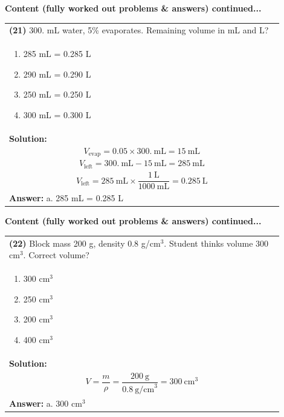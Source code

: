 \documentclass{article}
\begin{document}
{\newpage
\noindent
{\large\textbf{Content (fully worked out problems \& answers) continued...}}\\[0.2em]
\vspace{0.2cm}
\begin{tabular}{|p{0.9\linewidth}|}
\hline
\vspace{0.2cm}
\textbf{(21)} 300. mL water, 5\% evaporates. Remaining volume in mL and L? \\
\begin{minipage}[t]{0.85\linewidth}
\begin{enumerate}[label=\alph*.]
   \item 285 mL = 0.285 L
   \item 290 mL = 0.290 L
   \item 250 mL = 0.250 L
   \item 300 mL = 0.300 L
\end{enumerate}
\end{minipage}\\
\hline
\vspace{0.2cm}
\textbf{Solution:} \\
\[
V_\text{evap} = 0.05 \times 300.~\text{mL} = 15~\text{mL}
\] \\
\[
V_\text{left} = 300.~\text{mL} - 15~\text{mL} = 285~\text{mL}
\] \\
\[
V_\text{left} = 285~\text{mL} \times \frac{1~\text{L}}{1000~\text{mL}} = 0.285~\text{L}
\] \\ 
\hline
\vspace{0.2cm}
\textbf{Answer:} a. 285 mL = 0.285 L \\
\hline
\end{tabular}


\newpage
\noindent
{\large\textbf{Content (fully worked out problems \& answers) continued...}\\[0.2em]
\vspace{0.2cm}
\begin{tabular}{|p{0.9\linewidth}|}
\hline
\vspace{0.2cm}
\textbf{(22)} Block mass 200 g, density 0.8 g/cm$^3$. Student thinks volume 300 cm$^3$. Correct volume? \\
\begin{minipage}[t]{0.85\linewidth}
\begin{enumerate}[label=\alph*.]
   \item 300 cm$^3$
   \item 250 cm$^3$
   \item 200 cm$^3$
   \item 400 cm$^3$
\end{enumerate}
\end{minipage}\\
\hline
\vspace{0.2cm}
\textbf{Solution:} \\
\[
V = \frac{m}{\rho} = \frac{200~\text{g}}{0.8~\text{g/cm}^3} = 300~\text{cm}^3
\] \\ 
\hline
\vspace{0.2cm}
\textbf{Answer:} a. 300 cm$^3$ \\
\hline
\end{tabular}

}}
\end{document}
